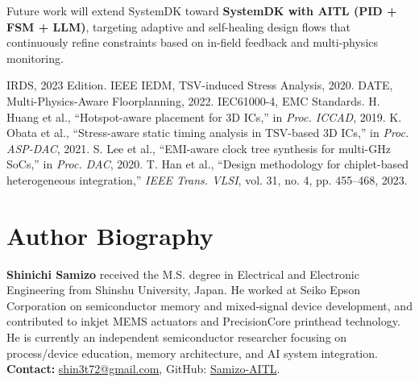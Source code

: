 \documentclass[conference]{IEEEtran}
\begin{document}
Future work will extend SystemDK toward \textbf{SystemDK with AITL
(PID + FSM + LLM)}, targeting adaptive and self-healing design flows that
continuously refine constraints based on in-field feedback and
multi-physics monitoring.

\begin{thebibliography}{1}

\IEEEtriggercmd{\enlargethispage{-2.5cm}} %

 IRDS, 2023 Edition.
 IEEE IEDM, TSV-induced Stress Analysis, 2020.
 DATE, Multi-Physics-Aware Floorplanning, 2022.
 IEC61000-4, EMC Standards.
 H. Huang et al., ``Hotspot-aware placement for 3D ICs,'' in \textit{Proc. ICCAD}, 2019.
 K. Obata et al., ``Stress-aware static timing analysis in TSV-based 3D ICs,'' in \textit{Proc. ASP-DAC}, 2021.
 S. Lee et al., ``EMI-aware clock tree synthesis for multi-GHz SoCs,'' in \textit{Proc. DAC}, 2020.
 T. Han et al., ``Design methodology for chiplet-based heterogeneous integration,'' \textit{IEEE Trans. VLSI}, vol. 31, no. 4, pp. 455–468, 2023.
\end{thebibliography}

\section*{Author Biography}
\noindent\textbf{Shinichi Samizo}
received the M.S. degree in Electrical and Electronic Engineering from Shinshu University, Japan.
He worked at Seiko Epson Corporation on semiconductor memory and mixed-signal device development, and contributed to inkjet MEMS actuators and PrecisionCore printhead technology.
He is currently an independent semiconductor researcher focusing on process/device education, memory architecture, and AI system integration.\\
\textbf{Contact:} \href{mailto:shin3t72@gmail.com}{shin3t72@gmail.com}, GitHub: \href{https://github.com/Samizo-AITL}{Samizo-AITL}.
\end{document}

